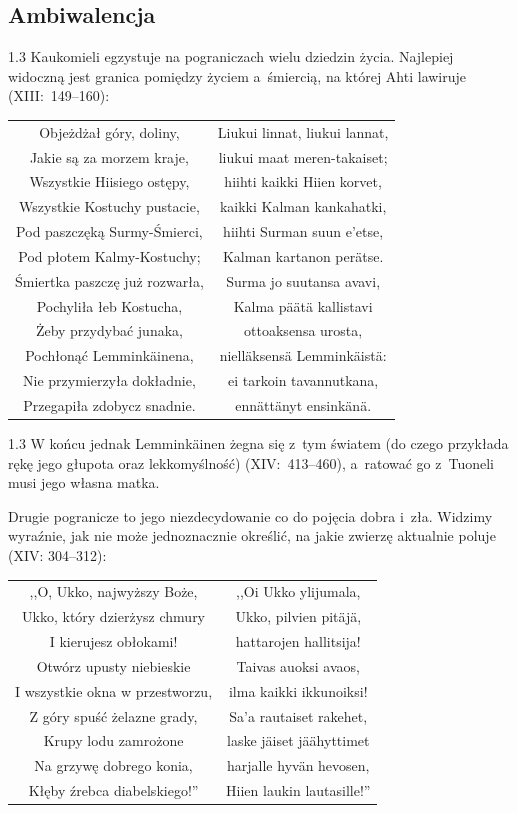 \documentclass[11pt,a4paper,twoside]{report}
\begin{document}
\subsection*{Ambiwalencja}
\begin{spacing}{1.3}
Kaukomieli egzystuje na pograniczach wielu dziedzin życia. Najlepiej widoczną jest granica pomiędzy życiem a~śmiercią, na której Ahti lawiruje (XIII:~149--160):
\end{spacing}
{\centering
\small
\begin{longtable}{c c}
Objeżdżał góry, doliny, & Liukui linnat, liukui lannat, \\
Jakie są za morzem kraje, & liukui maat meren-takaiset; \\
Wszystkie Hiisiego ostępy, & hiihti kaikki Hiien korvet, \\
Wszystkie Kostuchy pustacie, & kaikki Kalman kankahatki, \\
Pod paszczęką Surmy-Śmierci, & hiihti Surman suun e'etse, \\
Pod płotem Kalmy-Kostuchy; & Kalman kartanon perätse. \\
Śmiertka paszczę już rozwarła, & Surma jo suutansa avavi, \\
Pochyliła łeb Kostucha, & Kalma päätä kallistavi \\
Żeby przydybać junaka, & ottoaksensa urosta, \\
Pochłonąć Lemminkäinena, & nielläksensä Lemminkäistä: \\
Nie przymierzyła dokładnie, & ei tarkoin tavannutkana, \\
Przegapiła zdobycz snadnie. & ennättänyt ensinkänä. \\
\end{longtable}
}
\begin{spacing}{1.3}
W końcu jednak Lemminkäinen żegna się z~tym światem (do czego przykłada rękę jego głupota oraz lekkomyślność) (XIV:~413--460), a~ratować go z~Tuoneli musi jego własna matka.

Drugie pogranicze to jego niezdecydowanie co do pojęcia dobra i~zła. Widzimy wyraźnie, jak nie może jednoznacznie określić, na jakie zwierzę aktualnie poluje (XIV: 304--312):
\end{spacing}
{\centering
\small
\begin{longtable}{c c}
,,O, Ukko, najwyższy Boże, & ,,Oi Ukko ylijumala, \\
Ukko, który dzierżysz chmury & Ukko, pilvien pitäjä, \\
I kierujesz obłokami! & hattarojen hallitsija! \\
Otwórz upusty niebieskie & Taivas auoksi avaos, \\
I wszystkie okna w przestworzu, & ilma kaikki ikkunoiksi! \\
Z góry spuść żelazne grady, & Sa'a rautaiset rakehet, \\
Krupy lodu zamrożone & laske jäiset jäähyttimet \\
Na grzywę dobrego konia, & harjalle hyvän hevosen, \\
Kłęby źrebca diabelskiego!'' & Hiien laukin lautasille!'' \\
\end{longtable}
}
\end{document}
